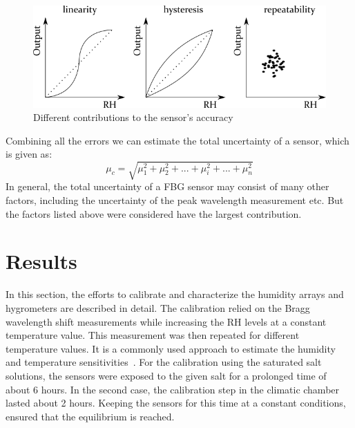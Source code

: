 \begin{figure}[!h]
\centering
\includegraphics[width=0.85\columnwidth]{Chapter5/images/Picture2.png}
\caption{Different contributions to the sensor's accuracy}
\label{fig:accuracy}
\end{figure}
Combining all the errors we can estimate the total uncertainty of a sensor, which is given as:
\begin{equation}
    \mu_{c} = \sqrt{\mu_{1}^{2} + \mu_{2}^{2} + ... + \mu_{i}^{2} + ... + \mu_{n}^{2}}
\end{equation}
In general, the total uncertainty of a \gls{FBG} sensor may consist of many other factors, including the uncertainty of the peak wavelength measurement etc. But the factors listed above were considered have the largest contribution. 

\section{Results}
\label{fbg_results}
In this section, the efforts to calibrate and characterize the humidity arrays and hygrometers are described in detail. The calibration relied on the Bragg wavelength shift measurements while increasing the \gls{RH} levels at a constant temperature value. This measurement was then repeated for different temperature values. It is a commonly used approach to estimate the humidity and temperature sensitivities~\cite{Berruti}. For the calibration using the saturated salt solutions, the sensors were exposed to the given salt for a prolonged time of about 6 hours. In the second case, the calibration step in the climatic chamber lasted about 2 hours. Keeping the sensors for this time at a constant conditions, ensured that the equilibrium is reached. 
